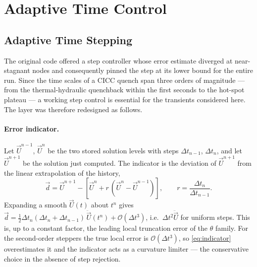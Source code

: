 \documentclass[11pt,a4paper]{article}
\begin{document}
\appendix 
\section{Adaptive Time Control}
\subsection{Adaptive Time Stepping}
\label{sec:adaptive}

The original code offered a step controller whose error estimate diverged at
near-stagnant nodes and consequently pinned the step at its lower bound for the
entire run. Since the time scales of a CICC quench span three orders of
magnitude --- from the thermal-hydraulic quenchback within the first seconds to
the hot-spot plateau --- a working step control is essential for the transients
considered here. The layer was therefore redesigned as follows.

\paragraph{Error indicator.}
Let $\vec{U}^{n-1}$, $\vec{U}^{n}$ be the two stored solution levels with steps
$\Delta t_{n-1}$, $\Delta t_n$, and let $\vec{U}^{n+1}$ be the solution just
computed. The indicator is the deviation of $\vec{U}^{n+1}$ from the linear
extrapolation of the history,
%
\begin{equation}
	\vec{d} = \vec{U}^{n+1} - \left[ \vec{U}^{n} + r\,(\vec{U}^{n} - \vec{U}^{n-1}) \right],
	\qquad r = \frac{\Delta t_n}{\Delta t_{n-1}} .
	\label{eq:indicator}
\end{equation}
%
Expanding a smooth $\vec{U}(t)$ about $t^n$ gives
$\vec{d} = \tfrac{1}{2}\Delta t_n (\Delta t_n + \Delta t_{n-1})\, \ddot{\vec{U}}(t^n)
+ \mathcal{O}(\Delta t^3)$, i.e.\ $\Delta t^2 \ddot{\vec{U}}$ for uniform steps.
This is, up to a constant factor, the leading local truncation error of the
$\theta$ family. For the second-order steppers the true local error is
$\mathcal{O}(\Delta t^3)$, so \eqref{eq:indicator} overestimates it and the
indicator acts as a curvature limiter --- the conservative choice in the absence
of step rejection.
\end{document}
